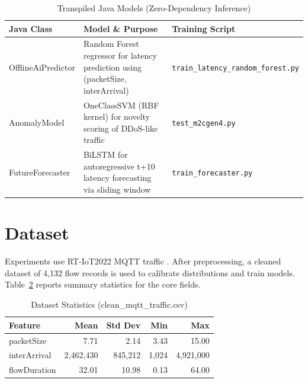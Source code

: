 \begin{table}[H]
\centering
\caption{Transpiled Java Models (Zero-Dependency Inference)}
\label{tab:transpiled}
\begin{tabularx}{\textwidth}{@{}lXX@{}}
\toprule
\textbf{Java Class} & \textbf{Model \& Purpose} & \textbf{Training Script} \\
\midrule
OfflineAiPredictor & Random Forest regressor for latency prediction using (packetSize, interArrival) & \texttt{train\_latency\_random\_forest.py} \\
AnomalyModel & OneClassSVM (RBF kernel) for novelty scoring of DDoS-like traffic & \texttt{test\_m2cgen4.py} \\
FutureForecaster & BiLSTM for autoregressive t+10 latency forecasting via sliding window & \texttt{train\_forecaster.py} \\
\bottomrule
\end{tabularx}
\end{table}

\section{Dataset}

Experiments use RT-IoT2022 MQTT traffic \cite{rt-iot}. After preprocessing, a cleaned dataset of 4,132 flow records is used to calibrate distributions and train models. Table~\ref{tab:dataset} reports summary statistics for the core fields.

\begin{table}[H]
\centering
\caption{Dataset Statistics (clean\_mqtt\_traffic.csv)}
\label{tab:dataset}
\begin{tabular}{@{}lrrrr@{}}
\toprule
\textbf{Feature} & \textbf{Mean} & \textbf{Std Dev} & \textbf{Min} & \textbf{Max} \\
\midrule
packetSize & 7.71 & 2.14 & 3.43 & 15.00 \\
interArrival & 2,462,430 & 845,212 & 1,024 & 4,921,000 \\
flowDuration & 32.01 & 10.98 & 0.13 & 64.00 \\
\bottomrule
\end{tabular}
\end{table}
